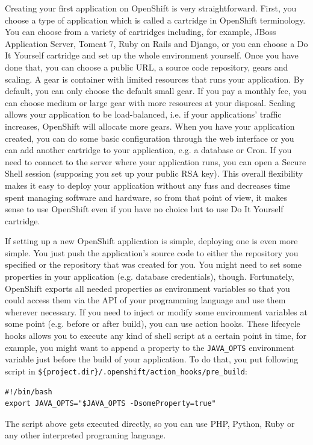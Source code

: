 Creating your first application on OpenShift is very straightforward. First, you choose a type of application which is called a cartridge in OpenShift terminology. You can choose from a variety of cartridges including, for example, JBoss Application Server, Tomcat 7, Ruby on Rails and Django, or you can choose a Do It Yourself cartridge and set up the whole environment yourself. Once you have done that, you can choose a public URL, a source code repository, gears and scaling. A gear is container with limited resources that runs your application. By default, you can only choose the default small gear. If you pay a monthly fee, you can choose medium or large gear with more resources at your disposal. Scaling allows your application to be load-balanced, i.e. if your applications' traffic increases, OpenShift will allocate more gears. When you have your application created, you can do some basic configuration through the web interface or you can add another cartridge to your application, e.g. a database or Cron. If you need to connect to the server where your application runs, you can open a Secure Shell session (supposing you set up your public RSA key). This overall flexibility makes it easy to deploy your application without any fuss and decreases time spent managing software and hardware, so from that point of view, it makes sense to use OpenShift even if you have no choice but to use Do It Yourself cartridge.

If setting up a new OpenShift application is simple, deploying one is even more simple. You just push the application's source code to either the repository you specified or the repository that was created for you. You might need to set some properties in your application (e.g. database credentials), though. Fortunately, OpenShift exports all needed properties as environment variables so that you could access them via the API of your programming language and use them wherever necessary. If you need to inject or modify some environment variables at some point (e.g. before or after build), you can use action hooks. These lifecycle hooks allows you to execute any kind of shell script at a certain point in time, for example, you might want to append a property to the \texttt{JAVA\_OPTS} environment variable just before the build of your application. To do that, you put following script in \texttt{\$\{project.dir\}/.openshift/action\_hooks/pre\_build}:

\begin{verbatim}
#!/bin/bash
export JAVA_OPTS="$JAVA_OPTS -DsomeProperty=true"
\end{verbatim}

The script above gets executed directly, so you can use PHP, Python, Ruby or any other interpreted programing language.
 
\faketext[3]

